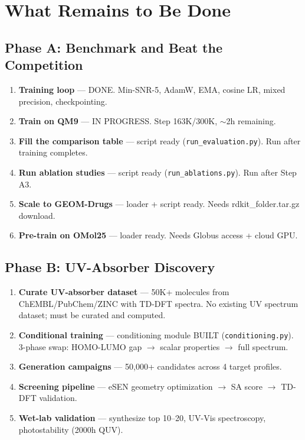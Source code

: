 \documentclass[12pt,a4paper]{article}
\begin{document}
\section{What Remains to Be Done}

\subsection{Phase A: Benchmark and Beat the Competition}

\begin{enumerate}
  \item[\checkmark] \textbf{Training loop} --- DONE. Min-SNR-5, AdamW, EMA, cosine LR, mixed precision, checkpointing.
  \item[$\circlearrowright$] \textbf{Train on QM9} --- IN PROGRESS. Step 163K/300K, $\sim$2h remaining.
  \item[\textbullet] \textbf{Fill the comparison table} --- script ready (\texttt{run\_evaluation.py}). Run after training completes.
  \item[\textbullet] \textbf{Run ablation studies} --- script ready (\texttt{run\_ablations.py}). Run after Step A3.
  \item[\textbullet] \textbf{Scale to GEOM-Drugs} --- loader + script ready. Needs rdkit\_folder.tar.gz download.
  \item[\textbullet] \textbf{Pre-train on OMol25} --- loader ready. Needs Globus access + cloud GPU.
\end{enumerate}

\subsection{Phase B: UV-Absorber Discovery}

\begin{enumerate}
  \item \textbf{Curate UV-absorber dataset} --- 50K+ molecules from ChEMBL/PubChem/ZINC with TD-DFT spectra. No existing UV spectrum dataset; must be curated and computed.
  \item \textbf{Conditional training} --- conditioning module BUILT (\texttt{conditioning.py}). 3-phase swap: HOMO-LUMO gap $\to$ scalar properties $\to$ full spectrum.
  \item \textbf{Generation campaigns} --- 50,000+ candidates across 4 target profiles.
  \item \textbf{Screening pipeline} --- eSEN geometry optimization $\to$ SA score $\to$ TD-DFT validation.
  \item \textbf{Wet-lab validation} --- synthesize top 10--20, UV-Vis spectroscopy, photostability (2000h QUV).
\end{enumerate}
\end{document}

